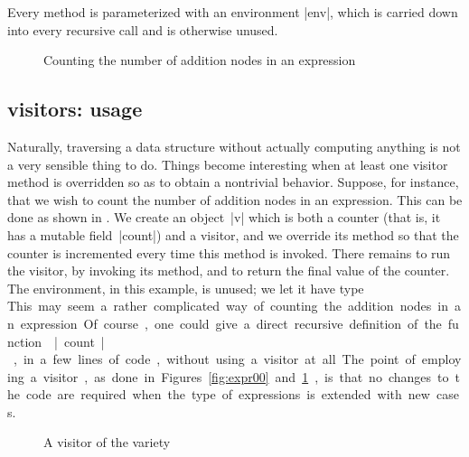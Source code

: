\documentclass[11pt,a4paper,twoside]{article}
\begin{document}
Every method is parameterized with an environment \oc|env|, which is carried
down into every recursive call and is otherwise unused.


\begin{figure}[t]
\caption{Counting the number of addition nodes in an expression}
\label{fig:expr04}
\end{figure}

\subsection{\iter visitors: usage}
\label{sec:intro:iter:usage}

Naturally, traversing a data structure without actually computing anything is
not a very sensible thing to do. Things become interesting when at least one
visitor method is overridden so as to obtain a nontrivial behavior. Suppose,
for instance, that we wish to count the number of addition nodes in an
expression. This can be done as shown in . We create an
object~\oc|v| which is both a counter (that is, it has a mutable
field~\oc|count|) and a visitor, and we override its method
 so that the counter is incremented every time this
method is invoked. There remains to run the visitor, by invoking its
 method, and to return the final value of the counter. The
environment, in this example, is unused; we let it have type \unit.

This may seem a rather complicated way of counting the addition nodes in an
expression. Of course, one could give a direct recursive definition of the
function \oc|count|, in a few lines of code, without using a visitor at all.
The point of employing a visitor, as done in Figures~\ref{fig:expr00}
and~\ref{fig:expr04}, is that no changes to the code are required when the
type of expressions is extended with new cases.


\begin{figure}[t]
\vspace{-\baselineskip}
\caption{A visitor of the \map variety}
\label{fig:expr01}
\end{figure}
\end{document}
